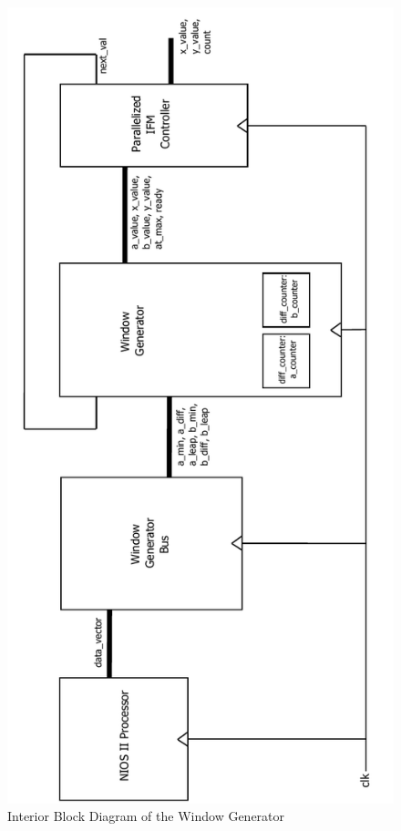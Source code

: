 \documentclass{article}
\begin{document}
\begin{figure}[h!]
  \centering
    \includegraphics[width=\textwidth]{block_diagrams/win_gen_interior.pdf}
  \caption{Interior Block Diagram of the Window Generator}
\end{figure}
\end{document}
